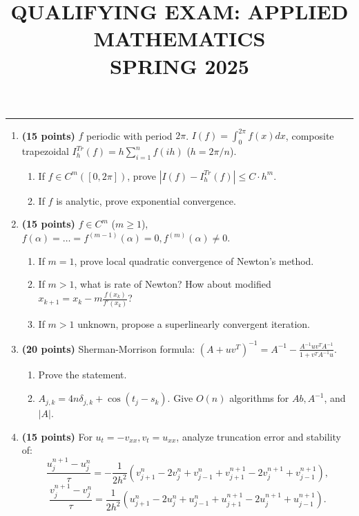 \documentclass[11pt,a4paper]{article}
\title{\textbf{QUALIFYING EXAM: APPLIED MATHEMATICS}\\[0.5em]\Large SPRING 2025}
\date{}
\author{}
\begin{document}
\maketitle
\vspace{-3em}

\noindent\rule{\linewidth}{0.4pt}

\begin{enumerate}[label=\textbf{\arabic*.}]
    \item \textbf{(15 points)} $f$ periodic with period $2\pi$. $I(f) = \int_0^{2\pi} f(x)dx$, composite trapezoidal $I_h^{Tr}(f) = h \sum_{i=1}^n f(ih)$ ($h = 2\pi/n$).
    \begin{enumerate}[label=(\roman*)]
        \item If $f \in C^m([0, 2\pi])$, prove $|I(f) - I_h^{Tr}(f)| \le C \cdot h^m$.
        \item If $f$ is analytic, prove exponential convergence.
    \end{enumerate}

    \item \textbf{(15 points)} $f \in C^m$ ($m \ge 1$), $f(\alpha) = \dots = f^{(m-1)}(\alpha) = 0, f^{(m)}(\alpha) \neq 0$.
    \begin{enumerate}[label=(\roman*)]
        \item If $m = 1$, prove local quadratic convergence of Newton's method.
        \item If $m > 1$, what is rate of Newton? How about modified $x_{k+1} = x_k - m \frac{f(x_k)}{f'(x_k)}$?
        \item If $m > 1$ unknown, propose a superlinearly convergent iteration.
    \end{enumerate}

    \item \textbf{(20 points)} Sherman-Morrison formula: $(A + uv^T)^{-1} = A^{-1} - \frac{A^{-1}uv^TA^{-1}}{1 + v^T A^{-1}u}$.
    \begin{enumerate}[label=(\roman*)]
        \item Prove the statement.
        \item $A_{j,k} = 4n \delta_{j,k} + \cos(t_j - s_k)$. Give $O(n)$ algorithms for $Ab, A^{-1}$, and $|A|$.
    \end{enumerate}

    \item \textbf{(15 points)} For $u_t = -v_{xx}, v_t = u_{xx}$, analyze truncation error and stability of:
    \[
    \frac{u_j^{n+1} - u_j^n}{\tau} = -\frac{1}{2h^2} (v_{j+1}^n - 2v_j^n + v_{j-1}^n + v_{j+1}^{n+1} - 2v_j^{n+1} + v_{j-1}^{n+1}),
    \]
    \[
    \frac{v_j^{n+1} - v_j^n}{\tau} = \frac{1}{2h^2} (u_{j+1}^n - 2u_j^n + u_{j-1}^n + u_{j+1}^{n+1} - 2u_j^{n+1} + u_{j-1}^{n+1}).
    \]


\end{enumerate}
\end{document}
